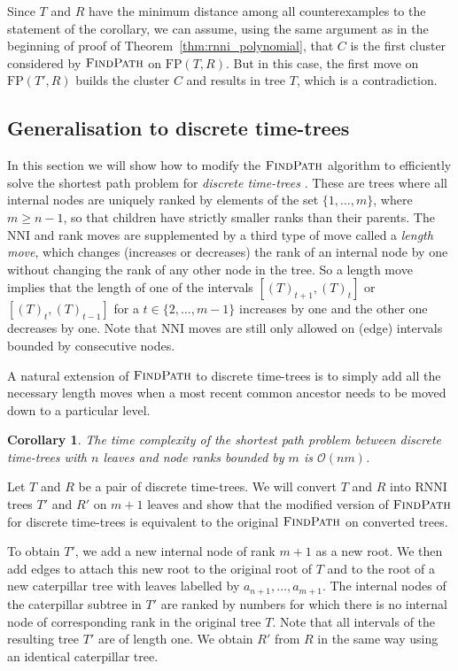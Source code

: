\documentclass[11pt]{amsart}
\newtheorem{corollary}{Corollary}
\newcommand{\rnni}{\mathrm{RNNI}}
\newcommand{\findpath}{\textsc{FindPath}}
\newcommand{\nni}{\mathrm{NNI}}
\newcommand{\fp}{\mathrm{FP}}
\renewcommand{\O}{\mathcal O}
\newcommand{\summary}[1]{} %
\begin{document}
Since $T$ and $R$ have the minimum distance among all counterexamples to the statement of the corollary, we can assume, using the same argument as in the beginning of proof of Theorem~\ref{thm:rnni_polynomial}, that $C$ is the first cluster considered by $\findpath$ on $\fp(T, R)$.
But in this case, the first move on $\fp(T',R)$ builds the cluster $C$ and results in tree $T$, which is a contradiction.
\endproof

\subsection{Generalisation to discrete time-trees}

\summary{Generalising $\findpath$ for discrete time-trees}
In this section we will show how to modify the $\findpath$ algorithm to efficiently solve the shortest path problem for \emph{discrete time-trees} \autocite{Gavryushkin2018-ol}.
These are trees where all internal nodes are uniquely ranked by elements of the set $\{1, \ldots, m\}$, where $m \geq n - 1$, so that children have strictly smaller ranks than their parents.
The NNI and rank moves are supplemented by a third type of move called a \emph{length move}, which changes (increases or decreases) the rank of an internal node by one without changing the rank of any other node in the tree.
So a length move implies that the length of one of the intervals $[(T)_{t+1},(T)_t]$ or $[(T)_t,(T)_{t-1}]$ for a $t \in \{2, \ldots, m-1\}$ increases by one and the other one decreases by one.
Note that $\nni$ moves are still only allowed on (edge) intervals bounded by consecutive nodes.

A natural extension of $\findpath$ to discrete time-trees is to simply add all the necessary length moves when a most recent common ancestor needs to be moved down to a particular level.
\begin{corollary}
The time complexity of the shortest path problem between discrete time-trees with $n$ leaves and node ranks bounded by $m$ is $\O(nm)$.
\label{cor:fp_dtt}
\end{corollary}

\proof
Let $T$ and $R$ be a pair of discrete time-trees.
We will convert $T$ and $R$ into $\rnni$ trees $T'$ and $R'$ on $m + 1$ leaves and show that the modified version of $\findpath$ for discrete time-trees is equivalent to the original $\findpath$ on converted trees.

To obtain $T'$, we add a new internal node of rank $m + 1$ as a new root.
We then add edges to attach this new root to the original root of $T$ and to the root of a new caterpillar tree with leaves labelled by $a_{n + 1}, \ldots, a_{m + 1}$.
The internal nodes of the caterpillar subtree in $T'$ are ranked by numbers for which there is no internal node of corresponding rank in the original tree $T$.
Note that all intervals of the resulting tree $T'$ are of length one.
We obtain $R'$ from $R$ in the same way using an identical caterpillar tree.
\end{document}
